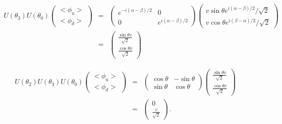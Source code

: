 \documentclass[11pt]{article}
\begin{document}
\begin{eqnarray}
    U(\theta_3)U(\theta_0)
    \begin{pmatrix}
      <\phi_u> \\ <\phi_d>
    \end{pmatrix}&=&
    \begin{pmatrix}
        e^{-i(\alpha-\beta)/2} & 0 \\0 &   e^{i(\alpha-\beta)/2} 
    \end{pmatrix}         
    \begin{pmatrix}
        v \sin\theta e^{i(\alpha-\beta)/2} /\sqrt 2 \\
        v \cos\theta e^{i(\beta-\alpha)/2} /\sqrt 2
    \end{pmatrix}\\
    &=&
    \begin{pmatrix}
        \frac{\sin\theta v}{\sqrt 2} \\
        \frac{\cos\theta v}{\sqrt 2}
    \end{pmatrix}
\end{eqnarray}

\begin{eqnarray}
    U(\theta_2) U(\theta_3)U(\theta_0)
    \begin{pmatrix}
      <\phi_u> \\ <\phi_d>
    \end{pmatrix}
    &=&
    \begin{pmatrix}
        \cos \theta & -\sin \theta \\ \sin \theta  & \cos \theta  
    \end{pmatrix}
    \begin{pmatrix}
        \frac{\sin\theta v}{\sqrt 2} \\
        \frac{\cos\theta v}{\sqrt 2}
    \end{pmatrix}\\
    &=&
    \begin{pmatrix}
      0 \\ \frac{v}{\sqrt 2}
    \end{pmatrix}.
\end{eqnarray}
\end{document}

